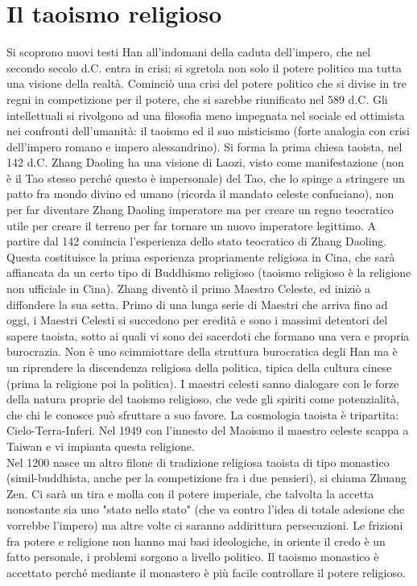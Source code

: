 \documentclass[10pt,a4paper]{report}
\begin{document}
\section{Il taoismo religioso}
Si scoprono nuovi testi Han all'indomani della caduta dell'impero, che nel secondo secolo d.C. entra in crisi; si sgretola non solo il potere politico ma tutta una visione della realtà. Cominciò una crisi del potere politico che si divise in tre regni in competizione per il potere, che si sarebbe riunificato nel 589 d.C. Gli intellettuali si rivolgono ad una filosofia meno impegnata nel sociale ed ottimista nei confronti dell'umanità: il taoismo ed il suo misticismo (forte analogia con crisi dell'impero romano e impero alessandrino). Si forma la prima chiesa taoista, nel 142 d.C. Zhang Daoling  ha una visione di Laozi, visto come manifestazione (non è il Tao stesso perché questo è impersonale) del Tao, che lo spinge a stringere un patto fra mondo divino ed umano (ricorda il mandato celeste confuciano), non per far diventare Zhang Daoling imperatore ma per creare un regno teocratico utile per creare il terreno per far tornare un nuovo imperatore legittimo. A partire dal 142 comincia l'esperienza dello stato teocratico di Zhang Daoling. Questa costituisce la prima esperienza propriamente religiosa in Cina, che sarà affiancata da un certo tipo di Buddhismo religioso (taoismo religioso è la religione non ufficiale in Cina). Zhang diventò il primo Maestro Celeste, ed iniziò a diffondere la sua setta. Primo di una lunga serie di Maestri che arriva fino ad oggi, i Maestri Celesti si succedono per eredità e sono i massimi detentori del sapere taoista, sotto ai quali vi sono dei sacerdoti che formano una vera e propria burocrazia. Non è uno scimmiottare della struttura burocratica degli Han ma è un riprendere la discendenza religiosa della politica, tipica della cultura cinese (prima la religione poi la politica). I maestri celesti sanno dialogare con le forze della natura proprie del taoismo religioso, che vede gli spiriti come potenzialità, che chi le conosce può sfruttare a suo favore. La cosmologia taoista è tripartita: Cielo-Terra-Inferi. Nel 1949 con l'innesto del Maoismo il maestro celeste scappa a Taiwan e vi impianta questa religione. \\
Nel 1200 nasce un altro filone di tradizione religiosa taoista di tipo monastico (simil-buddhista, anche per la competizione fra i due pensieri), si chiama Zhuang Zen. Ci sarà un tira e molla con il potere imperiale, che talvolta la accetta nonostante sia uno "stato nello stato" (che va contro l'idea di totale adesione che vorrebbe l'impero) ma altre volte ci saranno addirittura persecuzioni. Le frizioni fra potere e religione non hanno mai basi ideologiche, in oriente il credo è un fatto personale, i problemi sorgono a livello politico. Il taoismo monastico è accettato perché mediante il monastero è più facile controllare il potere religioso. 
\end{document}
